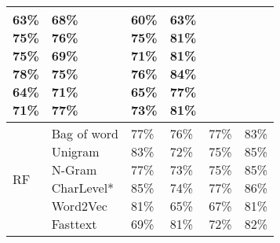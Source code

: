\documentclass[11pt]{article}
\begin{document}
\begin{table*}[H]
\begin{tabular}{llllll}
\makecell{63\% \\75\%\\ 75\%\\ 78\%\\ 64\% \\71\%}&
\makecell{68\% \\ 76\%\\ 69\%\\ 75\% \\ 71\%\\ 77\%}&
\makecell{60\% \\ 75\%\\  71\%\\ 76\% \\ 65\% \\73\%}&
\makecell{63\% \\ 81\%\\81\%\\ 84\% \\77\% \\81\%}\\
\hline
RF & \makecell{Bag of word\\  Unigram\\ N-Gram\\CharLevel*\\ Word2Vec \\Fasttext} & 
\makecell{77\%\\ 83\%\\ 77\%\\ 85\% \\ 81\% \\69\%}&
\makecell{76\% \\ 72\%\\ 73\%\\74\% \\ 65\% \\81\%}&
\makecell{77\% \\ 75\%\\ 75\%\\77\% \\ 67\% \\ 72\%}&
\makecell{83\% \\ 85\%\\ 85\%\\86\% \\ 81\% \\82\%}

\end{tabular}
\end{table*}
\end{document}
